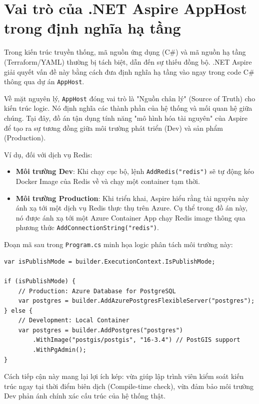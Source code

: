 \documentclass[a4paper,12pt,twoside]{report}
\begin{document}
\section{Vai trò của .NET Aspire AppHost trong định nghĩa hạ tầng}

Trong kiến trúc truyền thống, mã nguồn ứng dụng (C\#) và mã nguồn hạ tầng (Terraform/YAML) thường bị tách biệt, dẫn đến sự thiếu đồng bộ. .NET Aspire giải quyết vấn đề này bằng cách đưa định nghĩa hạ tầng vào ngay trong code C\# thông qua dự án \texttt{AppHost}.

Về mặt nguyên lý, \texttt{AppHost} đóng vai trò là "Nguồn chân lý" (Source of Truth) cho kiến trúc logic. Nó định nghĩa các thành phần của hệ thống và mối quan hệ giữa chúng. Tại đây, đồ án tận dụng tính năng "mô hình hóa tài nguyên" của Aspire để tạo ra sự tương đồng giữa môi trường phát triển (Dev) và sản phẩm (Production).

Ví dụ, đối với dịch vụ Redis:
\begin{itemize}
    \item \textbf{Môi trường Dev}: Khi chạy cục bộ, lệnh \texttt{AddRedis("redis")} sẽ tự động kéo Docker Image của Redis về và chạy một container tạm thời.
    \item \textbf{Môi trường Production}: Khi triển khai, Aspire hiểu rằng tài nguyên này ánh xạ tới một dịch vụ Redis thực thụ trên Azure. Cụ thể trong đồ án này, nó được ánh xạ tới một Azure Container App chạy Redis image thông qua phương thức \texttt{AddConnectionString("redis")}.
\end{itemize}

Đoạn mã sau trong \texttt{Program.cs} minh họa logic phân tách môi trường này:

\begin{lstlisting}[language={[Sharp]C}, caption={Cấu hình Dev/Prod Parity trong AppHost}, label={code:apphost-parity}]
var isPublishMode = builder.ExecutionContext.IsPublishMode;

if (isPublishMode) {
    // Production: Azure Database for PostgreSQL
    var postgres = builder.AddAzurePostgresFlexibleServer("postgres");
} else {
    // Development: Local Container
    var postgres = builder.AddPostgres("postgres")
        .WithImage("postgis/postgis", "16-3.4") // PostGIS support
        .WithPgAdmin();
}
\end{lstlisting}

Cách tiếp cận này mang lại lợi ích kép: vừa giúp lập trình viên kiểm soát kiến trúc ngay tại thời điểm biên dịch (Compile-time check), vừa đảm bảo môi trường Dev phản ánh chính xác cấu trúc của hệ thống thật.
\end{document}
